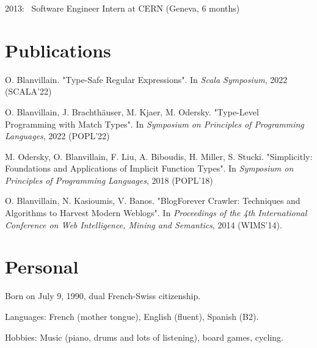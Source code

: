 \documentclass[marginmode, 11pt]{res}
\begin{document}
\begin{resume}
2013:~ Software Engineer Intern at CERN (Geneva, 6 months)

\section{Publications}

O. Blanvillain. "Type-Safe Regular Expressions". In \emph{Scala Symposium}, 2022 (SCALA'22)

O. Blanvillain, J. Brachthäuser, M. Kjaer, M. Odersky. "Type-Level Programming with Match Types". In \emph{Symposium on Principles of Programming Languages}, 2022 (POPL'22)

M. Odersky, O. Blanvillain, F. Liu, A. Biboudis, H. Miller, S. Stucki. "Simplicitly: Foundations and Applications of Implicit Function Types". In \emph{Symposium on Principles of Programming Languages}, 2018 (POPL'18)

O. Blanvillain, N. Kasioumis, V. Banos. "BlogForever Crawler: Techniques and Algorithms to Harvest Modern Weblogs". In \emph{Proceedings of the 4th International Conference on Web Intelligence, Mining and Semantics}, 2014 (WIMS'14).

\section{Personal}

Born on July 9, 1990, dual French-Swiss citizenship.

Languages: French (mother tongue), English (fluent), Spanish (B2).

Hobbies: Music (piano, drums and lots of listening), board games, cycling.

\end{resume}
\end{document}
